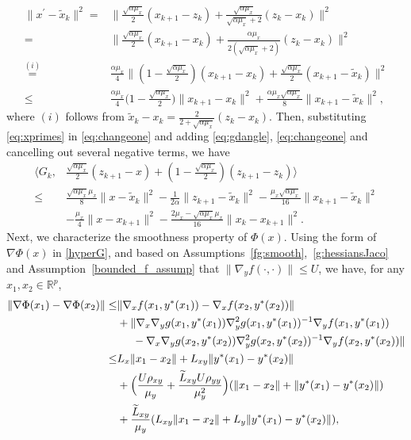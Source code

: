 \documentclass{osudissert96}
\begin{document}
\begin{align}\label{eq:xprimes}
\|x^\prime - \widetilde x_k\|^2 = & \Big\|\frac{\sqrt{\alpha\mu_x}}{2}(x_{k+1}-z_k)+ \frac{\sqrt{\alpha\mu_x}}{\sqrt{\alpha\mu_x}+2}(z_k-x_k)\Big\|^2  \nonumber
\\ =& \Big\| \frac{\sqrt{\alpha\mu_x}}{2}(x_{k+1}-x_k)+ \frac{\alpha\mu_x}{2(\sqrt{\alpha\mu_x}+2)}(z_k-x_k)  \Big\|^2 \nonumber
\\ \overset{(i)}= & \frac{\alpha\mu_x}{4} \Big\|(1-\frac{\sqrt{\alpha\mu_x}}{2})(x_{k+1}-x_k) + \frac{\sqrt{\alpha\mu_x}}{2} (x_{k+1}-\widetilde x_k)\Big\|^2 \nonumber
\\ \leq &  \frac{\alpha\mu_x}{4} \big(1-\frac{\sqrt{\alpha\mu_x}}{2}\big) \|x_{k+1}-x_k\|^2 +   \frac{\alpha\mu_x\sqrt{\alpha\mu_x}}{8}\|x_{k+1}-\widetilde x_k\|^2,
\end{align}
where $(i)$ follows from $\widetilde x_k - x_k=\frac{2}{2+\sqrt{\alpha\mu_x} }(z_k-x_k)$.  Then, substituting \cref{eq:xprimes} in \cref{eq:changeone} and adding \cref{eq:gdangle}, \cref{eq:changeone} and cancelling out several negative terms, we have
\begin{align}\label{eq:gkquick}
\big \langle G_k, &\frac{\sqrt{\alpha\mu_x}}{2}(z_{k+1}-x) + (1-\frac{\sqrt{\alpha\mu_x}}{2}) (z_{k+1}-z_k) \big\rangle \nonumber
\\\leq& \frac{\sqrt{\alpha\mu_x}\mu_x}{8}\|x-\widetilde x_k\|^2-\frac{1}{2\alpha} \|z_{k+1}-\widetilde x_k\|^2 - \frac{\mu_x\sqrt{\alpha\mu_x}}{16} \|x_{k+1}-\widetilde x_k\|^2\nonumber
\\&-\frac{\mu_x}{4} \|x-x_{k+1}\|^2 -\frac{2\mu_x -\sqrt{\alpha\mu_x}\mu_x}{16} \|x_k-x_{k+1}\|^2.
\end{align}
Next, we characterize the smoothness property of $\Phi(x)$. Using the form of $\nabla \Phi(x)$ in \cref{hyperG}, and based on Assumptions~\ref{fg:smooth},~\ref{g:hessiansJaco} and Assumption~\ref{bounded_f_assump} that $\|\nabla_yf(\cdot,\cdot)\|\leq U$, we have, for any $x_1,x_2\in\mathbb{R}^p$, 
\begin{align*}
\|\nabla\Phi(x_1) - \nabla\Phi(x_2)\|
\leq& \|\nabla_x f(x_1,y^*(x_1)) -\nabla_x f(x_2,y^*(x_2))  \| \nonumber
\\&+ \|\nabla_x \nabla_y g(x_1,y^*(x_1)) \nabla_y^2 g(x_1,y^*(x_1))^{-1}\nabla_y f(x_1,y^*(x_1)) \nonumber
\\&\hspace{0.5cm}-\nabla_x \nabla_y g(x_2,y^*(x_2)) \nabla_y^2 g(x_2,y^*(x_2))^{-1}\nabla_y f(x_2,y^*(x_2))\| \nonumber
\\  \leq & L_x\|x_1-x_2\| + L_{xy}\|y^*(x_1)-y^*(x_2)\| \nonumber
\\&+ \Big(\frac{U\rho_{xy}}{\mu_y}+\frac{\widetilde L_{xy}U\rho_{yy}}{\mu_y^2}\Big)(\|x_1-x_2\|+\|y^*(x_1)-y^*(x_2)\|)  \nonumber
\\&+ \frac{\widetilde L_{xy}}{\mu_y} (L_{xy}\|x_1-x_2\|
+L_y\|y^*(x_1)-y^*(x_2)\|),
\end{align*}
\end{document}
